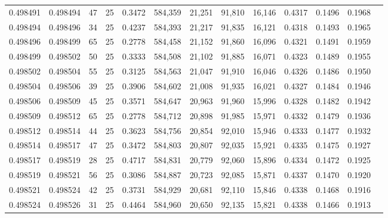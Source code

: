 \begin{tabular}{rrrrrrrrrrrrr}
0.498491 & 0.498494 &    47 &  25 &                                     0.3472 & 584,359 &  21,251 &  91,810 &  16,146 & 0.4317 & 0.1496 & 0.1968 \\
0.498494 & 0.498496 &    34 &  25 &                                     0.4237 & 584,393 &  21,217 &  91,835 &  16,121 & 0.4318 & 0.1493 & 0.1965 \\
0.498496 & 0.498499 &    65 &  25 &                                     0.2778 & 584,458 &  21,152 &  91,860 &  16,096 & 0.4321 & 0.1491 & 0.1959 \\
0.498499 & 0.498502 &    50 &  25 &                                     0.3333 & 584,508 &  21,102 &  91,885 &  16,071 & 0.4323 & 0.1489 & 0.1955 \\
0.498502 & 0.498504 &    55 &  25 &                                     0.3125 & 584,563 &  21,047 &  91,910 &  16,046 & 0.4326 & 0.1486 & 0.1950 \\
0.498504 & 0.498506 &    39 &  25 &                                     0.3906 & 584,602 &  21,008 &  91,935 &  16,021 & 0.4327 & 0.1484 & 0.1946 \\
0.498506 & 0.498509 &    45 &  25 &                                     0.3571 & 584,647 &  20,963 &  91,960 &  15,996 & 0.4328 & 0.1482 & 0.1942 \\
0.498509 & 0.498512 &    65 &  25 &                                     0.2778 & 584,712 &  20,898 &  91,985 &  15,971 & 0.4332 & 0.1479 & 0.1936 \\
0.498512 & 0.498514 &    44 &  25 &                                     0.3623 & 584,756 &  20,854 &  92,010 &  15,946 & 0.4333 & 0.1477 & 0.1932 \\
0.498514 & 0.498517 &    47 &  25 &                                     0.3472 & 584,803 &  20,807 &  92,035 &  15,921 & 0.4335 & 0.1475 & 0.1927 \\
0.498517 & 0.498519 &    28 &  25 &                                     0.4717 & 584,831 &  20,779 &  92,060 &  15,896 & 0.4334 & 0.1472 & 0.1925 \\
0.498519 & 0.498521 &    56 &  25 &                                     0.3086 & 584,887 &  20,723 &  92,085 &  15,871 & 0.4337 & 0.1470 & 0.1920 \\
0.498521 & 0.498524 &    42 &  25 &                                     0.3731 & 584,929 &  20,681 &  92,110 &  15,846 & 0.4338 & 0.1468 & 0.1916 \\
0.498524 & 0.498526 &    31 &  25 &                                     0.4464 & 584,960 &  20,650 &  92,135 &  15,821 & 0.4338 & 0.1466 & 0.1913 \\

\end{tabular}
